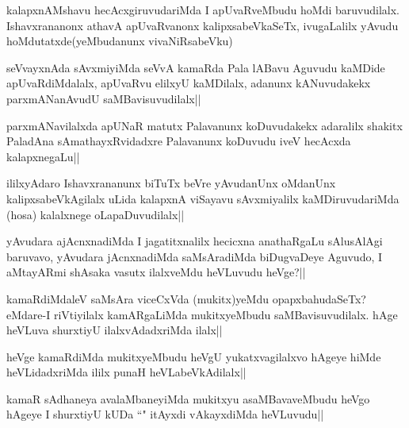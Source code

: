 \begin{artha}
kalapxnAMshavu hecAcxgiruvudariMda I apUvaRveMbudu hoMdi baruvudilalx. Ishavxrananonx athavA apUvaRvanonx kalipxsabeVkaSeTx, ivugaLalilx yAvudu hoMdutatxde(yeMbudanunx vivaNiRsabeVku)
\end{artha}


\begin{artha}
seVvayxnAda sAvxmiyiMda seVvA kamaRda Pala lABavu Aguvudu kaMDide apUvaRdiMdalalx, apUvaRvu elilxyU kaMDilalx, adanunx kANuvudakekx parxmANanAvudU saMBavisuvudilalx||
\end{artha}

\begin{artha}%
parxmANavilalxda apUNaR matutx Palavanunx koDuvudakekx adaralilx shakitx PaladAna sAmathayxRvidadxre Palavanunx koDuvudu iveV hecAcxda kalapxnegaLu||
\end{artha}

\begin{artha}
ililxyAdaro Ishavxrananunx biTuTx beVre yAvudanUnx oMdanUnx kalipxsabeVkAgilalx uLida kalapxnA viSayavu sAvxmiyalilx kaMDiruvudariMda (hosa) kalalxnege oLapaDuvudilalx||
\end{artha}

\begin{artha}
yAvudara ajAcnxnadiMda I jagatitxnalilx hecicxna anathaRgaLu sAlusAlAgi baruvavo, yAvudara jAcnxnadiMda saMsAradiMda biDugvaDeye Aguvudo, I aMtayARmi shAsaka vasutx ilalxveMdu heVLuvudu heVge?||
\end{artha}


\begin{artha}
kamaRdiMdaleV saMsAra viceCxVda (mukitx)yeMdu opapxbahudaSeTx? eMdare-I riVtiyilalx kamARgaLiMda mukitxyeMbudu saMBavisuvudilalx. hAge heVLuva shurxtiyU ilalxvAdadxriMda ilalx||
\end{artha}

\begin{artha}%
heVge kamaRdiMda mukitxyeMbudu heVgU yukatxvagilalxvo hAgeye hiMde heVLidadxriMda ililx punaH heVLabeVkAdilalx||
\end{artha}

\begin{artha}
kamaR sAdhaneya avalaMbaneyiMda mukitxyu asaMBavaveMbudu heVgo hAgeye I shurxtiyU kUDa ``\stext " itAyxdi vAkayxdiMda heVLuvudu||
\end{artha}

